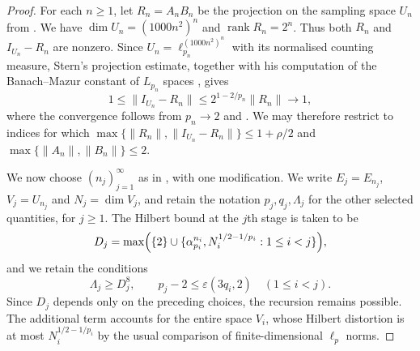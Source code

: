 \documentclass[11pt,a4paper,reqno]{amsart}
\theoremstyle{definition}
\newcommand{\norm}[1]{\lVert #1\rVert}
\DeclareMathOperator{\rank}{rank}
\numberwithin{equation}{section}
\begin{document}
\begin{proof}
For each $n\geq1$, let $R_n=A_nB_n$ be the projection on the sampling space $U_n$ from . We have $\dim U_n=(1000n^2)^n$ and $\rank R_n=2^n$. Thus both $R_n$ and $I_{U_n}-R_n$ are nonzero. Since $U_n=\ell_{p_n}^{(1000n^2)^n}$ with its normalised counting measure, Stern's projection estimate, together with his computation of the Banach--Mazur constant of $L_{p_n}$ spaces \cite[Sections~4 and~5]{Stern2015}, gives
\begin{equation*}
 1\leq\norm{I_{U_n}-R_n}\leq2^{1-2/p_n}\norm{R_n}
 \longrightarrow1,
\end{equation*}
where the convergence follows from $p_n\to2$ and . We may therefore restrict to indices for which $\max\{\norm{R_n},\norm{I_{U_n}-R_n}\}\leq1+\rho/2$ and $\max\{\norm{A_n},\norm{B_n}\}\leq2$.

We now choose $(n_j)_{j=1}^{\infty}$ as in , with one modification. We write $E_j=E_{n_j}$, $V_j=U_{n_j}$ and $N_j=\dim V_j$, and retain the notation $p_j,q_j,\Lambda_j$ for the other selected quantities, for $j\geq1$. The Hilbert bound at the $j$th stage is taken to be
\begin{equation*}
 D_j=\max\Bigl(\{2\}\cup
       \{\alpha_{p_i}^{n_i},N_i^{1/2-1/p_i}:1\leq i<j\}\Bigr),
\end{equation*}
and we retain the conditions
\begin{equation}\label{eq:full-head-separation}
 \Lambda_j\geq D_j^8,\qquad
 p_j-2\leq\varepsilon(3q_i,2)\quad(1\leq i<j).
\end{equation}
Since $D_j$ depends only on the preceding choices, the recursion remains possible. The additional term accounts for the entire space $V_i$, whose Hilbert distortion is at most $N_i^{1/2-1/p_i}$ by the usual comparison of finite-dimensional $\ell_p$ norms.


\end{proof}
\end{document}
